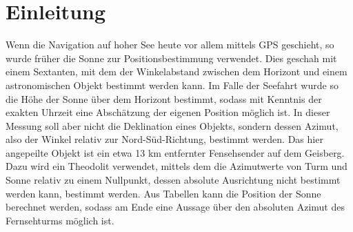 \section{Einleitung}
Wenn die Navigation auf hoher See heute vor allem mittels GPS geschieht, so wurde früher die Sonne zur Positionsbestimmung verwendet. Dies geschah mit einem Sextanten, mit dem der Winkelabstand zwischen dem Horizont und einem astronomischen Objekt bestimmt werden kann. Im Falle der Seefahrt wurde so die Höhe der Sonne über dem Horizont bestimmt, sodass mit Kenntnis der exakten Uhrzeit eine Abschätzung der eigenen Position möglich ist. In dieser Messung soll aber nicht die Deklination eines Objekts, sondern dessen Azimut, also der Winkel relativ zur Nord-Süd-Richtung, bestimmt werden. Das hier angepeilte Objekt ist ein etwa 13 km entfernter Fensehsender auf dem Geisberg. Dazu wird ein Theodolit verwendet, mittels dem die Azimutwerte von Turm und Sonne relativ zu einem Nullpunkt, dessen absolute Ausrichtung nicht bestimmt werden kann, bestimmt werden. Aus Tabellen kann die Position der Sonne berechnet werden, sodass am Ende eine Aussage über den absoluten Azimut des Fernsehturms möglich ist. 
